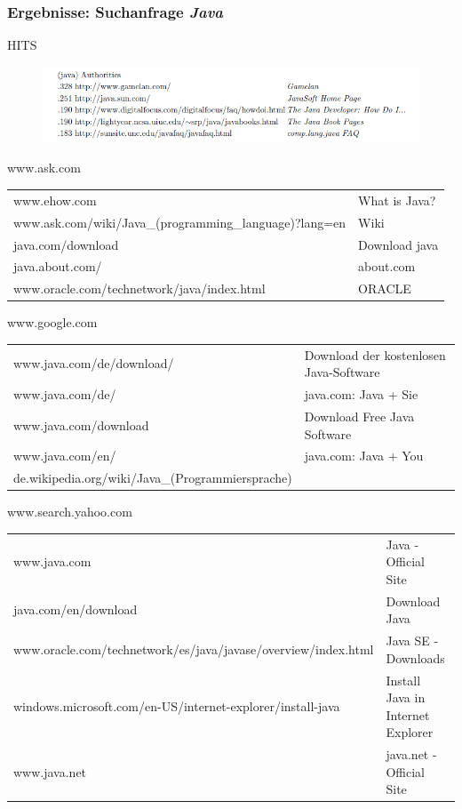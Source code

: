 \documentclass[hyperref={pdfpagelabels=false}]{beamer}
\begin{document}
\begin{frame}[allowframebreaks]
\frametitle{Ergebnisse: Suchanfrage {\it\glqq Java\grqq} }
\fontsize{6pt}{7.2}\selectfont

\begin{block}{HITS \cite{Kleinberg}}
	\begin{figure} [th]
		\includegraphics[scale=0.3]{java.png} 
	\end{figure}
\end{block}

\begin{block}{www.ask.com}
	\begin{tabular}{l l}
		www.ehow.com & What is Java? \\
		www.ask.com/wiki/Java\_(programming\_language)?lang=en & Wiki\\
		java.com/download & Download java\\
		java.about.com/ &  about.com\\
		www.oracle.com/technetwork/java/index.html & ORACLE\\
	\end{tabular}
\end{block}

\framebreak

\begin{block}{www.google.com}
	\begin{tabular}{l l}
		www.java.com/de/download/ & Download der kostenlosen Java-Software \\
		www.java.com/de/ & java.com: Java + Sie\\
		www.java.com/download & Download Free Java Software\\
		www.java.com/en/ & java.com: Java + You \\
		de.wikipedia.org/wiki/Java\_(Programmiersprache) & \\
	\end{tabular}
\end{block}

\begin{block}{www.search.yahoo.com}
	\begin{tabular}{l l}
		www.java.com & Java - Official Site \\
		java.com/en/download & Download Java \\
		www.oracle.com/technetwork/es/java/javase/overview/index.html & Java SE - Downloads \\
		windows.microsoft.com/en-US/internet-explorer/install-java & Install Java in Internet Explorer \\
		www.java.net & java.net - Official Site\\
	\end{tabular}
\end{block}
\end{frame}
\end{document}
